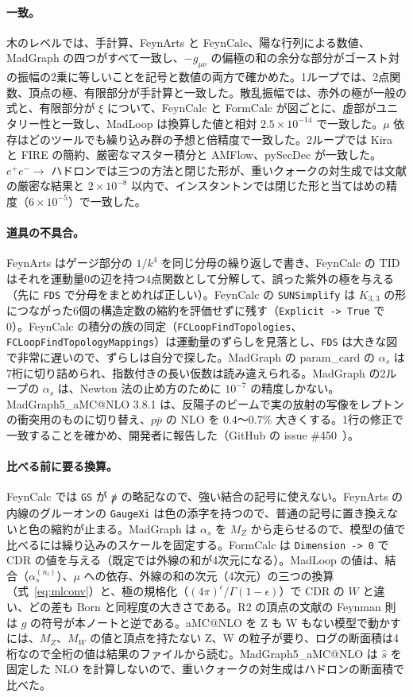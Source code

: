 \documentclass[a4paper,10pt]{ltjsarticle}
\begin{document}
\paragraph{一致。}木のレベルでは、手計算、FeynArts と FeynCalc、陽な行列による数値、MadGraph の四つがすべて一致し、$-g_{\mu\nu}$ の偏極の和の余分な部分がゴースト対の振幅の2乗に等しいことを記号と数値の両方で確かめた。1ループでは、2点関数、頂点の極、有限部分が手計算と一致した。散乱振幅では、赤外の極が一般の式と、有限部分が $\xi$ について、FeynCalc と FormCalc が図ごとに、虚部がユニタリー性と一致し、MadLoop は換算した値と相対 $2.5\times10^{-14}$ で一致した。$\mu$ 依存はどのツールでも繰り込み群の予想と倍精度で一致した。2ループでは Kira と FIRE の簡約、厳密なマスター積分と AMFlow、pySecDec が一致した。$e^+e^-\to$ ハドロンでは三つの方法と閉じた形が、重いクォークの対生成では文献の厳密な結果と $2\times10^{-8}$ 以内で、インスタントンでは閉じた形と当てはめの精度（$6\times10^{-5}$）で一致した。

\paragraph{道具の不具合。}FeynArts はゲージ部分の $1/k^4$ を同じ分母の繰り返しで書き、FeynCalc の TID はそれを運動量0の辺を持つ4点関数として分解して、誤った紫外の極を与える（先に \texttt{FDS} で分母をまとめれば正しい）。FeynCalc の \texttt{SUNSimplify} は $K_{3,3}$ の形につながった6個の構造定数の縮約を評価せずに残す（\texttt{Explicit -> True} で0）。FeynCalc の積分の族の同定（\texttt{FCLoopFindTopologies}、\texttt{FCLoopFindTopologyMappings}）は運動量のずらしを見落とし、\texttt{FDS} は大きな図で非常に遅いので、ずらしは自分で探した。MadGraph の param\_card の $\alpha_s$ は7桁に切り詰められ、指数付きの長い仮数は読み違えられる。MadGraph の2ループの $\alpha_s$ は、Newton 法の止め方のために $10^{-7}$ の精度しかない。MadGraph5\_aMC@NLO 3.8.1 は、反陽子のビームで実の放射の写像をレプトンの衝突用のものに切り替え、$p\bar p$ の NLO を $0.4$〜$0.7\%$ 大きくする。1行の修正で一致することを確かめ、開発者に報告した（GitHub の issue \#450~\cite{mg5issue}）。

\paragraph{比べる前に要る換算。}FeynCalc では \texttt{GS} が $\slashed p$ の略記なので、強い結合の記号に使えない。FeynArts の内線のグルーオンの \texttt{GaugeXi} は色の添字を持つので、普通の記号に置き換えないと色の縮約が止まる。MadGraph は $\alpha_s$ を $M_Z$ から走らせるので、模型の値で比べるには繰り込みのスケールを固定する。FormCalc は \texttt{Dimension -> 0} で CDR の値を与える（既定では外線の和が4次元になる）。MadLoop の値は、結合（$\alpha_s^{(n_l)}$）、$\mu$ への依存、外線の和の次元（4次元）の三つの換算（式~\eqref{eq:mlconv}）と、極の規格化（$(4\pi)^\epsilon/\Gamma(1-\epsilon)$）で CDR の $W$ と違い、どの差も Born と同程度の大きさである。R2 の頂点の文献の Feynman 則は $g$ の符号が本ノートと逆である。aMC@NLO を Z も W もない模型で動かすには、$M_Z$、$M_W$ の値と頂点を持たない Z、W の粒子が要り、ログの断面積は4桁なので全桁の値は結果のファイルから読む。MadGraph5\_aMC@NLO は $\hat s$ を固定した NLO を計算しないので、重いクォークの対生成はハドロンの断面積で比べた。
\end{document}
